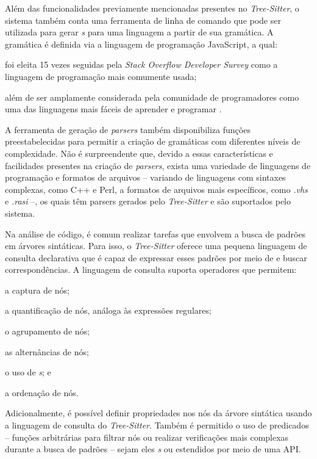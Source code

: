 \documentclass[11pt, a4paper, english, openright, twoside, brazil]{abntex2}
\begin{document}
  Além das funcionalidades previamente mencionadas presentes no
  \textit{Tree-Sitter}, o sistema também conta uma ferramenta de linha de
  comando que pode ser utilizada para gerar \textit{s} para uma
  linguagem a partir de sua gramática. A gramática é definida via a linguagem
  de programação JavaScript, a qual:
  \begin{inparaenum}
    \item foi eleita 15 vezes seguidas pela
          \textit{Stack Overflow Developer Survey}
          \cite{stack-overflow-2022-stack} como a linguagem de programação mais
          comumente usada;
    \item além de ser amplamente considerada pela comunidade de programadores
          como uma das linguagens mais fáceis de aprender e programar
          \cites {berkeley-2023-11}{goel-2023-how}{w3schools-2023-javascript}.
  \end{inparaenum}
  A ferramenta de geração de \textit{parsers} também disponibiliza funções
  preestabelecidas para permitir a criação de gramáticas com diferentes níveis
  de complexidade. Não é surpreendente que, devido a essas características e
  facilidades presentes na criação de \textit{parsers}, exista uma variedade de
  linguagens de programação e formatos de arquivos -- variando de linguagens
  com sintaxes complexas, como C++ e Perl, a formatos de arquivos mais
  específicos, como \textit{.vhs} e \textit{.rasi} --, os quais têm parsers
  gerados pelo \textit{Tree-Sitter} e são suportados pelo sistema.

  Na análise de código, é comum realizar tarefas que envolvem a busca de
  padrões em árvores sintáticas. Para isso, o \textit{Tree-Sitter} oferece uma
  pequena linguagem de consulta declarativa que é capaz de expressar esses
  padrões por meio de \textit{} e buscar correspondências. A
  linguagem de consulta suporta operadores que permitem:
  \begin{inparaenum}
    \item a captura de nós;
    \item a quantificação de nós, análoga às expressões regulares;
    \item o agrupamento de nós;
    \item as alternâncias de nós;
    \item o uso de \textit{s}; e
    \item a ordenação de nós.
  \end{inparaenum}
  Adicionalmente, é possível definir propriedades nos nós da árvore sintática
  usando a linguagem de consulta do \textit{Tree-Sitter}. Também é permitido o
  uso de predicados -- funções arbitrárias para filtrar nós ou realizar
  verificações mais complexas durante a busca de padrões -- sejam eles
  \textit{s} ou estendidos por meio de uma API.
\end{document}
